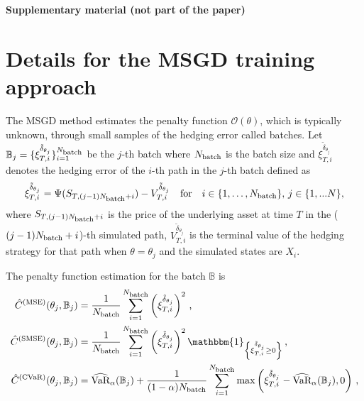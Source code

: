 \centerline{\Large \textbf{Supplementary material (not part of the paper)}}


\section{Details for the MSGD training approach}\label{appen:MSGDtraining}

The MSGD method estimates the penalty function $\mathcal{O}(\theta)$, which is typically unknown, through small samples of the hedging error called batches. Let $\mathbb{B}_{j}=\{ \xi_{T,i}^{\tilde{\delta}_{\theta_{j}}} \}_{i=1}^{N_{\mbox{\scriptsize{batch}}}}$ be the $j$-th batch where $N_{\mbox{\scriptsize{batch}}}$ is the batch size and $\xi_{T,i}^{\tilde{\delta}_{\theta_{j}}}$ denotes the hedging error of the $i$-th path in the $j$-th batch defined as
$$\xi_{T,i}^{\tilde{\delta}_{\theta_{j}}} = \Psi(S_{T,(j-1)N_{\mbox{\scriptsize{batch}}}+i}) - V_{T,i}^{\tilde{\delta}_{\theta_{j}}} \quad \mbox{for} \quad i\in\{1,\dots,N_{\mbox{\scriptsize{batch}}}\}, \, j\in\{1,...N \},$$
where $S_{T,(j-1)N_{\mbox{\scriptsize{batch}}}+i}$ is the price of the underlying asset at time $T$ in the ($(j-1)N_{\mbox{\scriptsize{batch}}}+i$)-th simulated path, $V_{T,i}^{\tilde{\delta}_{\theta_{j}}}$ is the terminal value of the hedging strategy for that path when $\theta = \theta_{j}$ and the simulated states are $X_{i}$. 

The penalty function estimation for the batch $\mathbb{B}$ is
\begin{align*}
    \Hat{C}^{\left(\mbox{\scriptsize{MSE}}\right)}(\theta_{j},\mathbb{B}_{j})&=\frac{1}{N_{\mbox{\scriptsize{batch}}}}\sum_{i=1}^{N_{\mbox{\scriptsize{batch}}}}\left(\xi_{T,i}^{\tilde{\delta}_{\theta_{j}}}\right)^{2}\, \mbox{,}\\
    \Hat{C}^{\left(\mbox{\scriptsize{SMSE}}\right)}(\theta_{j},\mathbb{B}_{j})&=\frac{1}{N_{\mbox{\scriptsize{batch}}}}\sum_{i=1}^{N_{\mbox{\scriptsize{batch}}}}\left(\xi_{T,i}^{\tilde{\delta}_{\theta_{j}}}\right)^{2}\mathbbm{1}_{\left\{\xi_{T,i}^{\tilde{\delta}_{\theta_{j}}}\geq 0\right\}}\, \mbox{,}\\
    \Hat{C}^{\left(\mbox{\scriptsize{CVaR}}\right)}(\theta_{j},\mathbb{B}_{j})&= \widehat{\mbox{VaR}}_{\alpha}(\mathbb{B}_{j})+\frac{1}{(1-\alpha)N_{\mbox{\scriptsize{batch}}}}\sum_{i=1}^{N_{\mbox{\scriptsize{batch}}}}\max\left( \xi_{T,i}^{\tilde{\delta}_{\theta_{j}}}-\widehat{\mbox{VaR}}_{\alpha}(\mathbb{B}_{j}),0 \right)\, \mbox{,}
\end{align*}

